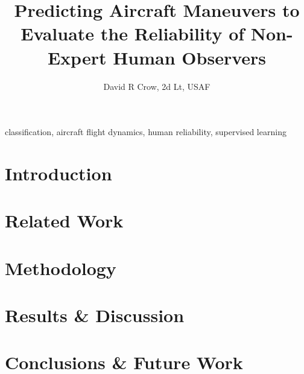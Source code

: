 \documentclass[journal]{IEEEtran}
\title{Predicting Aircraft Maneuvers to Evaluate the Reliability of Non-Expert Human Observers}
\author{David R Crow, 2d Lt, USAF}
\begin{document}
\maketitle



\begin{IEEEkeywords}
classification, aircraft flight dynamics, \newline human reliability, supervised learning
\end{IEEEkeywords}

\section{Introduction}\label{sec:intro}


\section{Related Work}\label{sec:related}


\section{Methodology}\label{sec:method}


\section{Results \& Discussion}\label{sec:results}


\section{Conclusions \& Future Work}\label{sec:conclusion}




\end{document}
